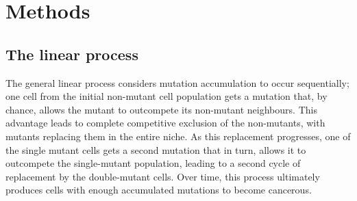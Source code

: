 \documentclass[12pt, onecolumn]{article}
\begin{document}
%	
	\section{Methods}
	\subsection{The linear process}
	The general linear process considers mutation accumulation to occur sequentially; one cell from the initial non-mutant cell population gets a mutation that, by chance, allows the mutant to outcompete its non-mutant neighbours. This advantage leads to complete competitive exclusion of the non-mutants, with mutants replacing them in the entire niche. As this replacement progresses, one of the single mutant cells gets a second mutation that in turn, allows it to outcompete the single-mutant population, leading to a second cycle of replacement by the double-mutant cells. Over time, this process ultimately produces cells with enough accumulated mutations to become cancerous.
	
\end{document}
